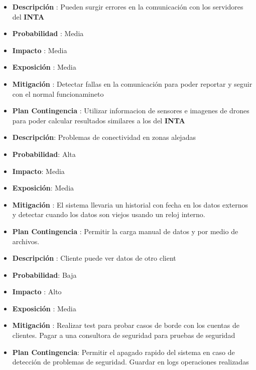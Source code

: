 

\begin{itemize}
 \item \textbf{Descripci\'on} : Pueden surgir errores en la comunicación con los servidores del \textbf{INTA}
 \item \textbf{Probabilidad} : Media
 \item \textbf{Impacto} : Media
 \item \textbf{Exposición} : Media
 \item \textbf{Mitigación} : Detectar fallas en la comunicación para poder reportar y seguir con el normal funcionamineto
 \item \textbf{Plan Contingencia} : Utilizar informacion de sensores e imagenes de drones para poder calcular resultados similares a los del \textbf{INTA}
 
\end{itemize}

\begin{itemize}
 \item \textbf{Descripci\'on}: Problemas de conectividad en zonas alejadas
 \item \textbf{Probabilidad}: Alta
 \item \textbf{Impacto}: Media
 \item \textbf{Exposición}: Media
 \item \textbf{Mitigación} : El sistema llevaria un historial con fecha en los datos externos y detectar cuando los datos son viejos usando un reloj interno.
 \item \textbf{Plan Contingencia} : Permitir la carga manual de datos y por medio de archivos.
 
\end{itemize}

\begin{itemize}
 \item \textbf{Descripci\'on} : Cliente puede ver datos de otro client
 \item \textbf{Probabilidad}: Baja
 \item \textbf{Impacto} : Alto
 \item \textbf{Exposición} : Media
 \item \textbf{Mitigación} : Realizar test para probar casos de borde con los cuentas de clientes. Pagar a una consultora de seguridad para pruebas de seguridad
 \item \textbf{Plan Contingencia}: Permitir el apagado rapido del sistema en caso de detecci\'on de problemas de seguridad. Guardar en logs operaciones realizadas
 
\end{itemize}

